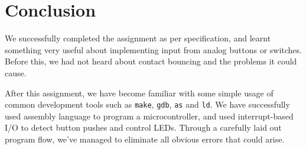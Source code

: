 \section{Conclusion}

We successfully completed the assignment as per specification, and
learnt something very useful about implementing input from analog
buttons or switches. Before this, we had not heard about contact
bouncing and the problems it could cause.

After this assignment, we have become familiar with some simple usage of
common development tools such as \texttt{make}, \texttt{gdb},
\texttt{as} and \texttt{ld}. We have successfully used assembly language
to program a microcontroller, and used interrupt-based I/O to detect
button pushes and control LEDs. Through a carefully laid out program
flow, we've managed to eliminate all obvious errors that could arise.
